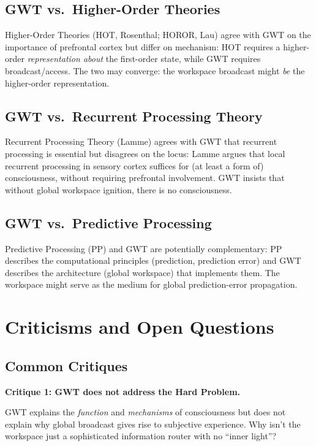 \documentclass[11pt,a4paper]{report}
\begin{document}
\section{GWT vs.\ Higher-Order Theories}

Higher-Order Theories (HOT, Rosenthal; HOROR, Lau) agree with GWT on the importance of prefrontal cortex but differ on mechanism: HOT requires a higher-order \emph{representation about} the first-order state, while GWT requires broadcast/access. The two may converge: the workspace broadcast might \emph{be} the higher-order representation.

\section{GWT vs.\ Recurrent Processing Theory}

Recurrent Processing Theory (Lamme) agrees with GWT that recurrent processing is essential but disagrees on the locus: Lamme argues that local recurrent processing in sensory cortex suffices for (at least a form of) consciousness, without requiring prefrontal involvement. GWT insists that without global workspace ignition, there is no consciousness.

\section{GWT vs.\ Predictive Processing}

Predictive Processing (PP) and GWT are potentially complementary: PP describes the computational principles (prediction, prediction error) and GWT describes the architecture (global workspace) that implements them. The workspace might serve as the medium for global prediction-error propagation.


\chapter{Criticisms and Open Questions}

\section{Common Critiques}

\textbf{Critique 1: GWT does not address the Hard Problem.}

GWT explains the \emph{function} and \emph{mechanisms} of consciousness but does not explain why global broadcast gives rise to subjective experience. Why isn't the workspace just a sophisticated information router with no ``inner light''?
\end{document}
